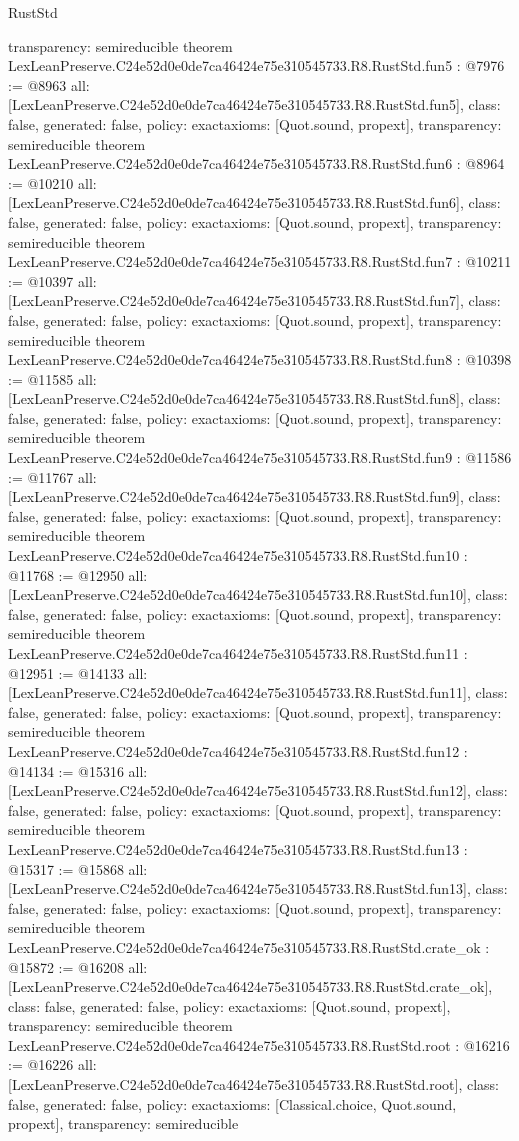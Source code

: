 \begin{lexlean}{RustStd}
\begin{coremodule}
{  transparency: semireducible
}
theorem LexLeanPreserve.C24e52d0e0de7ca46424e75e310545733.R8.RustStd.fun5 : @7976 := @8963 {
  all: [LexLeanPreserve.C24e52d0e0de7ca46424e75e310545733.R8.RustStd.fun5],
  class: false,
  generated: false,
  policy: exact{axioms: [Quot.sound, propext]},
  transparency: semireducible
}
theorem LexLeanPreserve.C24e52d0e0de7ca46424e75e310545733.R8.RustStd.fun6 : @8964 := @10210 {
  all: [LexLeanPreserve.C24e52d0e0de7ca46424e75e310545733.R8.RustStd.fun6],
  class: false,
  generated: false,
  policy: exact{axioms: [Quot.sound, propext]},
  transparency: semireducible
}
theorem LexLeanPreserve.C24e52d0e0de7ca46424e75e310545733.R8.RustStd.fun7 : @10211 := @10397 {
  all: [LexLeanPreserve.C24e52d0e0de7ca46424e75e310545733.R8.RustStd.fun7],
  class: false,
  generated: false,
  policy: exact{axioms: [Quot.sound, propext]},
  transparency: semireducible
}
theorem LexLeanPreserve.C24e52d0e0de7ca46424e75e310545733.R8.RustStd.fun8 : @10398 := @11585 {
  all: [LexLeanPreserve.C24e52d0e0de7ca46424e75e310545733.R8.RustStd.fun8],
  class: false,
  generated: false,
  policy: exact{axioms: [Quot.sound, propext]},
  transparency: semireducible
}
theorem LexLeanPreserve.C24e52d0e0de7ca46424e75e310545733.R8.RustStd.fun9 : @11586 := @11767 {
  all: [LexLeanPreserve.C24e52d0e0de7ca46424e75e310545733.R8.RustStd.fun9],
  class: false,
  generated: false,
  policy: exact{axioms: [Quot.sound, propext]},
  transparency: semireducible
}
theorem LexLeanPreserve.C24e52d0e0de7ca46424e75e310545733.R8.RustStd.fun10 : @11768 := @12950 {
  all: [LexLeanPreserve.C24e52d0e0de7ca46424e75e310545733.R8.RustStd.fun10],
  class: false,
  generated: false,
  policy: exact{axioms: [Quot.sound, propext]},
  transparency: semireducible
}
theorem LexLeanPreserve.C24e52d0e0de7ca46424e75e310545733.R8.RustStd.fun11 : @12951 := @14133 {
  all: [LexLeanPreserve.C24e52d0e0de7ca46424e75e310545733.R8.RustStd.fun11],
  class: false,
  generated: false,
  policy: exact{axioms: [Quot.sound, propext]},
  transparency: semireducible
}
theorem LexLeanPreserve.C24e52d0e0de7ca46424e75e310545733.R8.RustStd.fun12 : @14134 := @15316 {
  all: [LexLeanPreserve.C24e52d0e0de7ca46424e75e310545733.R8.RustStd.fun12],
  class: false,
  generated: false,
  policy: exact{axioms: [Quot.sound, propext]},
  transparency: semireducible
}
theorem LexLeanPreserve.C24e52d0e0de7ca46424e75e310545733.R8.RustStd.fun13 : @15317 := @15868 {
  all: [LexLeanPreserve.C24e52d0e0de7ca46424e75e310545733.R8.RustStd.fun13],
  class: false,
  generated: false,
  policy: exact{axioms: [Quot.sound, propext]},
  transparency: semireducible
}
theorem LexLeanPreserve.C24e52d0e0de7ca46424e75e310545733.R8.RustStd.crate_ok : @15872 := @16208 {
  all: [LexLeanPreserve.C24e52d0e0de7ca46424e75e310545733.R8.RustStd.crate_ok],
  class: false,
  generated: false,
  policy: exact{axioms: [Quot.sound, propext]},
  transparency: semireducible
}
theorem LexLeanPreserve.C24e52d0e0de7ca46424e75e310545733.R8.RustStd.root : @16216 := @16226 {
  all: [LexLeanPreserve.C24e52d0e0de7ca46424e75e310545733.R8.RustStd.root],
  class: false,
  generated: false,
  policy: exact{axioms: [Classical.choice, Quot.sound, propext]},
  transparency: semireducible
}


\end{coremodule}
\end{lexlean}
